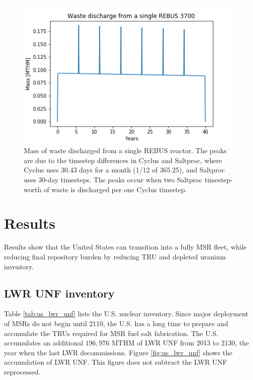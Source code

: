 \begin{figure}[htbp!]
	\begin{center}
		\includegraphics[scale=0.6]{./images/us/rebus_waste.png}
	\end{center}
	\caption{Mass of waste discharged from a single REBUS reactor. The peaks
		are due to the timestep differences in Cyclus and Saltproc, where Cyclus
		uses 30.43 days for a month (1/12 of 365.25), and Saltproc uses 30-day
		timesteps. The peaks occur when two Saltproc timestep-worth of waste is discharged
		per one Cyclus timestep.
	}
	\label{fig:rebus_waste}
\end{figure}



\section{Results}
Results show that the United States can transition into a
fully \gls{MSR} fleet, while reducing final repository
burden by reducing \gls{TRU} and depleted uranium
inventory.

\subsection{\gls{LWR} \gls{UNF} inventory}

Table \ref{tab:us_lwr_unf} lists the U.S. nuclear inventory.
Since major deployment of \glspl{MSR} do not begin until 2110,
the U.S. has a long time to prepare and accumulate the \glspl{TRU}
required for \gls{MSR} fuel salt fabrication. The U.S. accumulates
an additional $196,976$ \gls{MTHM} of \gls{LWR} \gls{UNF}
from 2013 to 2130, the year when the last \gls{LWR} decommissions.
Figure \ref{fig:us_lwr_unf} shows the accumulation of \gls{LWR} \gls{UNF}.
This figure does not subtract the \gls{LWR} \gls{UNF} reprocessed.


